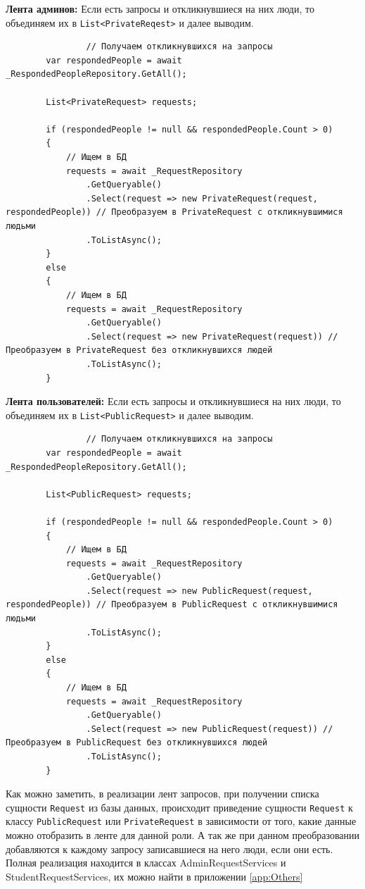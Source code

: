 \textbf{Лента админов:} Если есть запросы и откликнувшиеся на них люди, то объединяем их в \texttt{List<PrivateReqest>} и далее выводим.
\begin{verbatim}
				// Получаем откликнувшихся на запросы
        var respondedPeople = await _RespondedPeopleRepository.GetAll();

        List<PrivateRequest> requests;

        if (respondedPeople != null && respondedPeople.Count > 0)
        {
            // Ищем в БД
            requests = await _RequestRepository
                .GetQueryable()
                .Select(request => new PrivateRequest(request, respondedPeople)) // Преобразуем в PrivateRequest с откликнувшимися людьми
                .ToListAsync();
        }
        else
        {
            // Ищем в БД
            requests = await _RequestRepository
                .GetQueryable()
                .Select(request => new PrivateRequest(request)) // Преобразуем в PrivateRequest без откликнувшихся людей
                .ToListAsync();
        }
\end{verbatim}

\textbf{Лента пользователей:}  Если есть запросы и откликнувшиеся на них люди, то объединяем их в \texttt{List<PublicRequest>} и далее выводим.
\begin{verbatim}
				// Получаем откликнувшихся на запросы
        var respondedPeople = await _RespondedPeopleRepository.GetAll();

        List<PublicRequest> requests;

        if (respondedPeople != null && respondedPeople.Count > 0)
        {
            // Ищем в БД
            requests = await _RequestRepository
                .GetQueryable()
                .Select(request => new PublicRequest(request, respondedPeople)) // Преобразуем в PublicRequest с откликнувшимися людьми
                .ToListAsync();
        }
        else
        {
            // Ищем в БД
            requests = await _RequestRepository
                .GetQueryable()
                .Select(request => new PublicRequest(request)) // Преобразуем в PublicRequest без откликнувшихся людей
                .ToListAsync();
        }
\end{verbatim}

Как можно заметить, в реализации лент запросов, при получении списка сущности \texttt{Request} из базы данных, происходит приведение сущности \texttt{Request} к классу \texttt{PublicRequest} или \texttt{PrivateRequest} в зависимости от того, какие данные можно отобразить в ленте для данной роли. А так же при данном преобразовании добавляются к каждому запросу записавшиеся на него люди, если они есть. Полная реализация находится в классах AdminRequestServices и StudentRequestServices, их можно найти в приложении \ref{app:Others}

